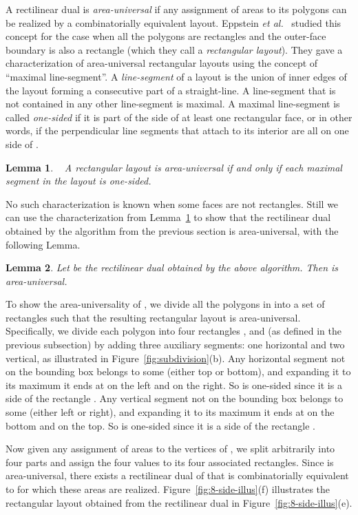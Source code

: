 \documentclass[11pt]{article}
\newtheorem{lemma}{Lemma}[section]
\newenvironment{proof}{{\bf Proof:} }{\hspace*{\fill}\vspace{2mm}}
\begin{document}
A rectilinear dual  is \textit{area-universal} if any assignment of areas to its polygons can be realized by a
 combinatorially equivalent layout. Eppstein \textit{et al.}~\cite{EMVS} studied
this concept
 for the case when all the polygons are rectangles and the outer-face
 boundary is also a rectangle (which they call a {\em rectangular layout}). They gave a characterization of area-universal rectangular layouts using the concept of
 ``maximal line-segment''.  A \textit{line-segment} of a layout is the union of inner edges of the layout forming a
 consecutive part of a straight-line. A line-segment that is not contained in any other line-segment is maximal. A
 maximal line-segment  is called {\em one-sided} if it is part of the side of at least one rectangular face, or
 in other words, if the perpendicular line segments that attach to its interior are all on one side of .

\begin{lemma}~\cite{EMVS}
\label{lem:area-uni} A rectangular layout
is area-universal if and only if each maximal segment in the layout is one-sided.
\end{lemma}


No such characterization is known when some faces are not rectangles.
Still we can use the characterization from
Lemma~\ref{lem:area-uni} to show that the rectilinear dual obtained by the algorithm from
the previous section is area-universal, with the following Lemma.


\begin{lemma}
\label{lem:eight-suff} Let  be the rectilinear dual
obtained by the above algorithm. Then  is area-universal.
\end{lemma}
\begin{proof} To show the area-universality of , we divide all the
polygons in  into a set of rectangles such that the resulting
rectangular layout is area-universal. Specifically, we divide each polygon 
into four rectangles  ,  and  (as defined in the previous subsection)
by adding three auxiliary segments: one horizontal and two vertical, as illustrated in
Figure~\ref{fig:subdivision}(b).
Any horizontal segment  not on the bounding box belongs to some 
(either top or bottom), and expanding it to its maximum it ends at
 on the left and  on the right.  So 
is one-sided since it is a side of the rectangle .
Any vertical segment  not on the bounding box belongs to some 
(either left or right), and expanding it to its maximum it ends at
 on the bottom and  on the top.  So 
is one-sided since it is a side of the rectangle .

Now given any assignment of areas  to the vertices  of , we split  arbitrarily
 into four parts and assign the four values to its four associated rectangles. Since  is area-universal,
 there exists a rectilinear dual of  that is combinatorially equivalent to  for which these areas are realized.
Figure~\ref{fig:8-side-illus}(f) illustrates the rectangular
layout obtained from the rectilinear dual in Figure~\ref{fig:8-side-illus}(e).
\end{proof}
\end{document}
